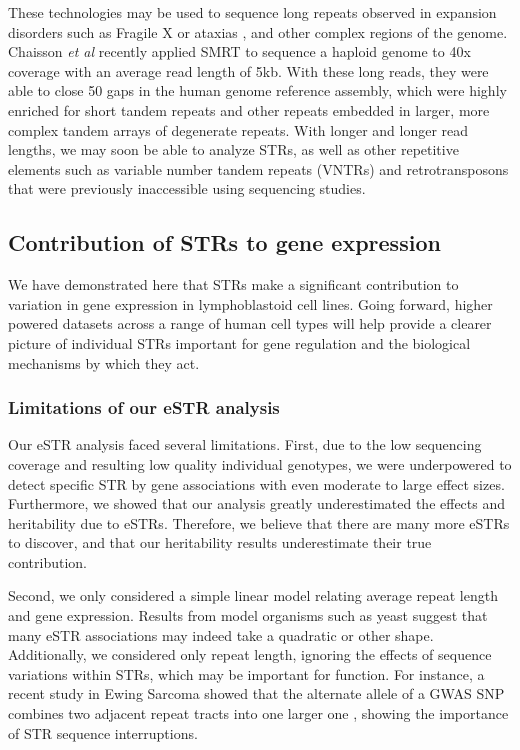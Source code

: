 These technologies may be used to sequence long repeats observed in expansion disorders such as Fragile X \cite{LoomisEidPelusoEtAl2012} or ataxias \cite{DoiMonjoHoangEtAl2013}, and other complex regions of the genome. Chaisson \emph{et al} \cite{ChaissonHuddlestonDennisEtAl2015} recently applied SMRT to sequence a haploid genome to 40x coverage with an average read length of 5kb. With these long reads, they were able to close 50 gaps in the human genome reference assembly, which were highly enriched for short tandem repeats and other repeats embedded in larger, more complex tandem arrays of degenerate repeats. With longer and longer read lengths, we may soon be able to analyze STRs, as well as other repetitive elements such as variable number tandem repeats (VNTRs) and retrotransposons that were previously inaccessible using sequencing studies.

\subsection{Contribution of STRs to gene expression}
We have demonstrated here that STRs make a significant contribution to variation in gene expression in lymphoblastoid cell lines. Going forward, higher powered datasets across a range of human cell types will help provide a clearer picture of individual STRs important for gene regulation and the biological mechanisms by which they act.

\subsubsection{Limitations of our eSTR analysis}
Our eSTR analysis faced several limitations. First, due to the low sequencing coverage and resulting low quality individual genotypes, we were underpowered to detect specific STR by gene associations with even moderate to large effect sizes. Furthermore, we showed that our analysis greatly underestimated the effects and heritability due to eSTRs. Therefore, we believe that there are many more eSTRs to discover, and that our heritability results underestimate their true contribution. 

Second, we only considered a simple linear model relating average repeat length and gene expression. Results from model organisms such as yeast \cite{GemayelVincesLegendreEtAl2010} suggest that many eSTR associations may indeed take a quadratic or other shape. Additionally, we considered only repeat length, ignoring the effects of sequence variations within STRs, which may be important for function. For instance, a recent study in Ewing Sarcoma showed that the alternate allele of a GWAS SNP combines two adjacent repeat tracts into one larger one \cite{GrunewaldBernardGilardi-HebenstreitEtAl2015}, showing the importance of STR sequence interruptions. 

